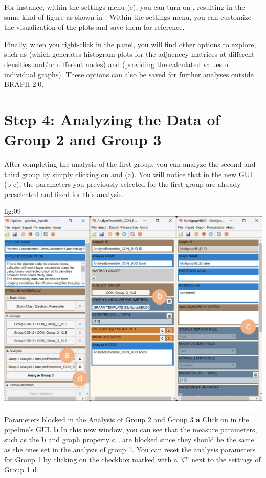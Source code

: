 \documentclass[justified]{tufte-handout}
\begin{document}
{For instance, within the settings menu (e), you can turn on , resulting in the same kind of figure as shown in . Within the settings menu, you can customize the visualization of the plots and save them for reference.

Finally, when you right-click in the  panel, you will find other options to explore, such as  (which generates histogram plots for the adjacnecy matrices at different densities and/or different nodes) and  (providing the calculated values of individual graphs). These options can also be saved for further analyses outside BRAPH 2.0.

\section{Step 4: Analyzing the Data of Group 2 and Group 3}

After completing the analysis of the first group, you can analyze the second and third group by simply clicking on  and  (a). You will notice that in the new GUI (b-c), the parameters you previously selected for the first group are already preselected and fixed for this analysis. 

	{fig:09}
	{
	\includegraphics{fig09.jpg}
	}
	{Parameters blocked in the Analysis of Group 2 and Group 3}
	{
	{\bf a} Click on  in the pipeline's GUI.
	{\bf b} In this new window, you can see that the measure parameters, such as the {\bf b}  and graph property {\bf c} , are blocked since they should be the same as the ones set in the analysis of group 1. You can reset the analysis parameters for Group 1 by clicking on the checkbox marked with a 'C' next to the settings of Group 1 {\bf d}.
	}
	
}
\end{document}

